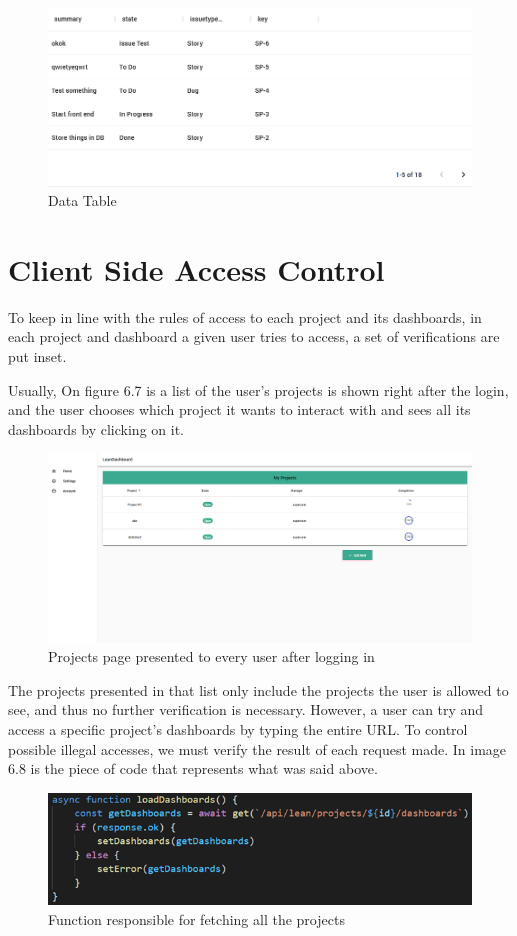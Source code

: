 \documentclass[a4paper,twoside,10pt]{report}
\begin{document}
\begin{figure}[h!]
\center
  \includegraphics[width=\textwidth]{data-table.png}
\caption{Data Table}
\end{figure}

\newpage
\section{Client Side Access Control}
To keep in line with the rules of access to each project and its dashboards, in each project and dashboard a given user tries to access, a set of verifications are put inset.

Usually, On figure 6.7 is a list of the user's projects is shown right after the login, and the user chooses which project it wants to interact with and sees all its dashboards by clicking on it.
\begin{figure}[h!]
\center
  \includegraphics[width=\textwidth]{projectsPage.png}
\caption{Projects page presented to every user after logging in}
\end{figure}

The projects presented in that list only include the projects the user is allowed to see, and thus no further verification is necessary.
However, a user can try and access a specific project’s dashboards by typing the entire URL. To control possible illegal accesses, we must verify the result of each request made. In image 6.8 is the piece of code that represents what was said above.
\begin{figure}[h!]
\center
  \includegraphics[width=\textwidth]{load-projects.png}
\caption{Function responsible for fetching all the projects}
\end{figure}
\end{document}
